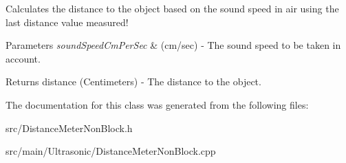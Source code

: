 Calculates the distance to the object based on the sound speed in air using the last distance value measured! 


\begin{DoxyParams}{Parameters}
{\em sound\+Speed\+Cm\+Per\+Sec} & (cm/sec) -\/ The sound speed to be taken in account. \\
\hline
\end{DoxyParams}
\begin{DoxyReturn}{Returns}
distance (Centimeters) -\/ The distance to the object. 
\end{DoxyReturn}


The documentation for this class was generated from the following files\+:\begin{DoxyCompactItemize}
\item 
src/Distance\+Meter\+Non\+Block.\+h\item 
src/main/\+Ultrasonic/Distance\+Meter\+Non\+Block.\+cpp\end{DoxyCompactItemize}
